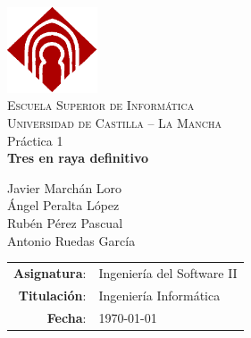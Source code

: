 \documentclass[a4paper,11pt,oneside]{article}
\begin{document}


\begin{titlepage}
\begin{center}

\includegraphics[width=0.2\textwidth]{img/logo-uclm.png}\\[1cm]
\textsc{\LARGE Escuela Superior de Informática}\\[0.5cm]
\textsc{\Large Universidad de Castilla -- La Mancha}\\[2.5cm]

{\LARGE Práctica 1}\\[0.5cm]
{\huge \textbf{Tres en raya definitivo}}\\[0.4cm]


  \begin{minipage}{0.8\textwidth}
  \large

  Javier Marchán Loro\\
  Ángel Peralta López\\
  Rubén Pérez Pascual\\
  Antonio Ruedas García\\
  \end{minipage}

  \vfill

\begin{minipage}{\textwidth}
\large
\begin{tabular}{rl}
\textbf{Asignatura}: & Ingeniería del Software II\\
\textbf{Titulación}: & Ingeniería Informática\\
\textbf{Fecha}: & \today
\end{tabular}
\end{minipage}

\end{center}
\end{titlepage}
\end{document}
